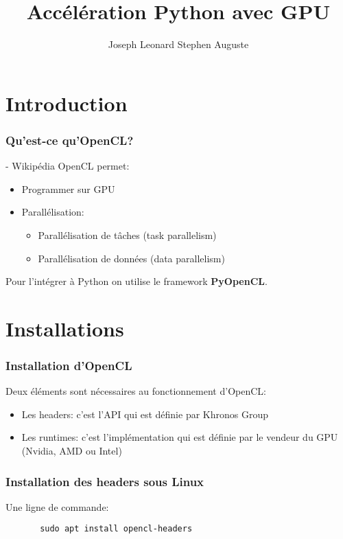 \documentclass[9pt]{beamer}
\title{Accélération Python avec GPU}
\author{Joseph Leonard Stephen Auguste}
\begin{document}
\maketitle

\section{Introduction}
\begin{frame}
    \frametitle{Qu'est-ce qu'OpenCL?}
    \newline
    \-- Wikipédia\pause{}
    \vspace{20pt}
    \newline
    OpenCL permet:\pause{}
    \begin{itemize}
        \item Programmer sur GPU\pause{}
        \item Parallélisation\pause{}:
            \begin{itemize}
                \item Parallélisation de tâches (task parallelism)
                \item Parallélisation de données (data parallelism)
            \end{itemize}
    \end{itemize}\pause{}
    \vspace{20pt}
    Pour l'intégrer à Python on utilise le framework \textbf{PyOpenCL}.
\end{frame}

\section{Installations}
\begin{frame}
    \frametitle{Installation d'OpenCL}
    Deux éléments sont nécessaires au fonctionnement d'OpenCL:\pause{}
    \begin{itemize}
        \item Les headers: c'est l'API qui est définie par Khronos Group\pause{}
        \item Les runtimes: c'est l'implémentation qui est définie par le 
            vendeur du GPU (Nvidia, AMD ou Intel)
    \end{itemize}
\end{frame}

\begin{frame}[fragile]
    \frametitle{Installation des headers sous Linux}
    Une ligne de commande:
    \begin{lstlisting}
       sudo apt install opencl-headers 
    \end{lstlisting}
\end{frame}
\end{document}
